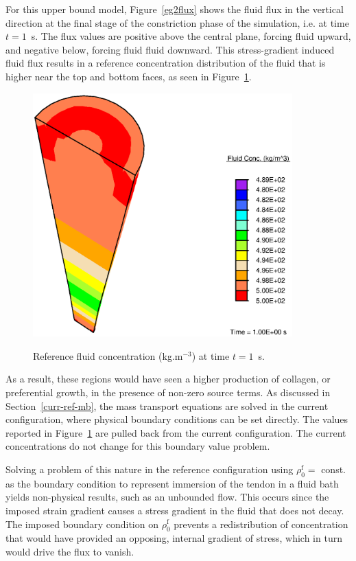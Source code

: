 \noindent For this upper bound model, Figure~\ref{eg2flux} shows the fluid flux in
the vertical direction at the final stage of the constriction phase of
the simulation, i.e. at time $t=1$~s. The flux values are positive
above the central plane, forcing fluid upward, and negative below,
forcing fluid fluid downward. This stress-gradient induced fluid flux
results in a reference concentration distribution of the fluid that is
higher near the top and bottom faces, as seen in Figure~\ref{eg2conc}.

\begin{figure}[ht]
  \centering
      {\includegraphics[width=10.00cm]{images/fluid-concentration.eps}}
      \caption{Reference fluid concentration (kg.m$^{-3}$) at time
      $t=1$~s.}
      \label{eg2conc}
\end{figure}

As a result, these regions would have seen a higher production of
collagen, or preferential growth, in the presence of non-zero source
terms. As discussed in Section~\ref{curr-ref-mb}, the mass transport
equations are solved in the current configuration, where physical
boundary conditions can be set directly. The values reported in
Figure~\ref{eg2conc} are pulled back from the current
configuration. The current concentrations do not change for this
boundary value problem. 

Solving a problem of this nature in the
reference configuration using $\rho_0^\mathrm{f} = $ const. as the
boundary condition to represent immersion of the tendon in a fluid bath
yields non-physical results, such as an unbounded flow. This occurs
since the imposed strain gradient causes a stress gradient in the
fluid that does not decay. The imposed boundary condition on $\rho_0^\mathrm{f}$
prevents a redistribution of concentration that would have provided an
opposing, internal gradient of stress, which in turn would drive the
flux to vanish.

